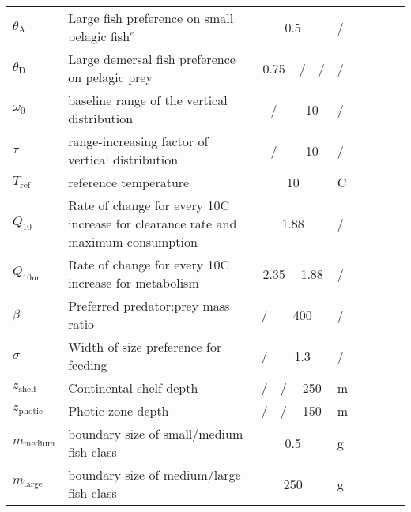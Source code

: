 \documentclass[
]{article}
\begin{document}
\begin{table}[htbp]
\begin{tabular}{lp{8cm}lp{1cm}lp{1cm}lp{1cm}lp{1cm}l}
$\theta_\mathrm{A}$ & Large fish preference on small pelagic fish$^e$ & \multicolumn{4}{c}{0.5} & / \\
$\theta_\mathrm{D}$ & Large demersal fish preference on pelagic prey & \multicolumn{2}{c}{0.75} & / & / & / \\
$\omega_0$ & baseline range of the vertical distribution & \multicolumn{2}{c}{/} & \multicolumn{2}{c}{10} & / \\
$\tau$ & range-increasing factor of vertical distribution & \multicolumn{2}{c}{/} & \multicolumn{2}{c}{10} & / \\
$T_{\mathrm{ref}}$ & reference temperature & \multicolumn{4}{c}{10} & \textdegree{}C \\
$Q_{\mathrm{10}}$ & Rate of change for every 10\textdegree{}C increase for clearance rate and maximum consumption & \multicolumn{4}{c}{1.88} & / \\
$Q_{\mathrm{10m}}$ & Rate of change for every 10\textdegree{}C increase for metabolism & \multicolumn{2}{c}{2.35} & \multicolumn{2}{c}{1.88} & / \\
$\beta$ & Preferred predator:prey mass ratio & / & \multicolumn{3}{c}{400} & / \\
$\sigma$ & Width of size preference for feeding & / & \multicolumn{3}{c}{1.3} & / \\
$z_{\mathrm{shelf}}$ & Continental shelf depth & / & / & \multicolumn{2}{c}{250} & m \\
$z_{\mathrm{photic}}$ & Photic zone depth & / & / & \multicolumn{2}{c}{150} & m \\
$m_{\mathrm{medium}}$ & boundary size of small/medium fish class & \multicolumn{4}{c}{0.5} & g \\
$m_{\mathrm{large}}$ & boundary size of medium/large fish class  & \multicolumn{4}{c}{250} & g \\


\end{tabular}
\end{table}
\end{document}
